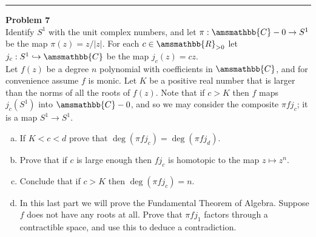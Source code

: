 \documentclass[a4paper, 12pt]{article}
\newenvironment{problem}[2][Problem]
    { \begin{mdframed}[backgroundcolor=gray!20] \textbf{#1 #2} \\}
    {  \end{mdframed}}
\renewcommand{\mathbb}{\amsmathbb}
\begin{document}
\noindent\rule{7in}{2.8pt}
\begin{problem}{7}
Identify \(S^1\) with the unit complex numbers, and let \(\pi:\mathbb{C}-0\rightarrow S^1\) be the map \(\pi(z)=z/|z|\). For each \(c\in \mathbb{R}_{>0}\) let \(j_c:S^1\hookrightarrow \mathbb{C}\) be the map \(j_c(z)=cz\).\\ 
Let \(f(z)\) be a degree \(n\) polynomial with coefficients in \(\mathbb{C}\), and for convenience assume \(f\) is monic. Let \(K\) be a positive real number that is larger than the norms of all the roots of \(f(z)\). 
Note that if \(c>K\) then \(f\) maps \(j_c(S^1)\) into \(\mathbb{C}-0\), and so we may consider the composite \(\pi fj_c\); it is a map \(S^1\rightarrow S^1\). 
\begin{enumerate}[(a)]
\item If \(K<c<d\) prove that \(\deg (\pi fj_c)=\deg (\pi fj_d)\). 
\item Prove that if \(c\) is large enough then \(fj_c\) is homotopic to the map \(z\mapsto z^n\).
\item Conclude that if \(c>K\) then \(\deg (\pi fj_c)=n\).
\item In this last part we will prove the Fundamental Theorem of Algebra. Suppose \(f\) does not have any roots at all. Prove that \(\pi fj_1\) factors through a contractible space, and use this to deduce a contradiction. 
\end{enumerate}
\end{problem}
\end{document}
